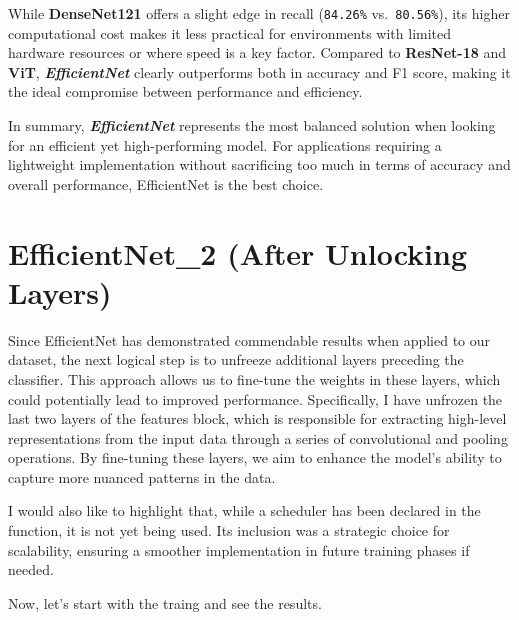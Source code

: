 \documentclass[12pt]{article}
\begin{document}
While \textbf{DenseNet121} offers a slight edge in recall
(\texttt{84.26\%} vs.~\texttt{80.56\%}), its higher computational cost
makes it less practical for environments with limited hardware resources
or where speed is a key factor. Compared to \textbf{ResNet-18} and
\textbf{ViT}, \textbf{\emph{EfficientNet}} clearly outperforms both in
accuracy and F1 score, making it the ideal compromise between
performance and efficiency.

In summary, \textbf{\emph{EfficientNet}} represents the most balanced
solution when looking for an efficient yet high-performing model. For
applications requiring a lightweight implementation without sacrificing
too much in terms of accuracy and overall performance, EfficientNet is
the best choice.

    \section{EfficientNet\_2 (After Unlocking
Layers)}\label{efficientnet_2-after-unlocking-layers}

    Since EfficientNet has demonstrated commendable results when applied to
our dataset, the next logical step is to unfreeze additional layers
preceding the classifier. This approach allows us to fine-tune the
weights in these layers, which could potentially lead to improved
performance. Specifically, I have unfrozen the last two layers of the
features block, which is responsible for extracting high-level
representations from the input data through a series of convolutional
and pooling operations. By fine-tuning these layers, we aim to enhance
the model's ability to capture more nuanced patterns in the data.

I would also like to highlight that, while a scheduler has been declared
in the function, it is not yet being used. Its inclusion was a strategic
choice for scalability, ensuring a smoother implementation in future
training phases if needed.

Now, let's start with the traing and see the results.
\end{document}
